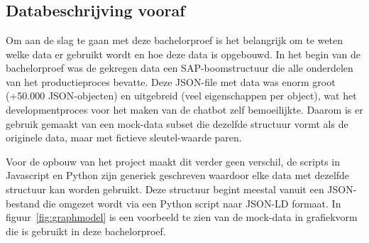 \chapter{}%
\label{ch:stand-van-zaken}
\section{Databeschrijving vooraf}{\label{sec:dataopstelling}}
Om aan de slag te gaan met deze bachelorproef is het belangrijk om te weten welke data er gebruikt wordt en hoe deze data is opgebouwd.
In het begin van de bachelorproef was de gekregen data een SAP-boomstructuur die alle onderdelen van het productieproces bevatte.
Deze JSON-file met data was enorm groot (+50.000 JSON-objecten) en uitgebreid (veel eigenschappen per object), wat het developmentproces voor het maken van de chatbot zelf bemoeilijkte.
Daarom is er gebruik gemaakt van een mock-data subset die dezelfde structuur vormt als de originele data, maar met fictieve sleutel-waarde paren.

Voor de opbouw van het project maakt dit verder geen verschil, de scripts in Javascript en Python zijn generiek geschreven waardoor elke data met dezelfde structuur kan worden gebruikt.
Deze structuur begint meestal vanuit een JSON-bestand die omgezet wordt via een Python script naar JSON-LD formaat.
In figuur~\ref{fig:graphmodel} is een voorbeeld te zien van de mock-data in grafiekvorm die is gebruikt in deze bachelorproef.





